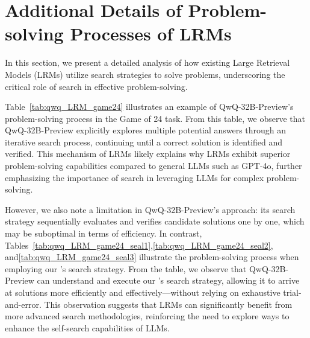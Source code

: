 \section{Additional Details of Problem-solving Processes of LRMs}
\label{appendix:more_details_of_problem_solving_processes_LRMs}
In this section, we present a detailed analysis of how existing Large Retrieval Models (LRMs) utilize search strategies to solve problems, underscoring the critical role of search in effective problem-solving. 

Table~\ref{tab:qwq_LRM_game24} illustrates an example of QwQ-32B-Preview's problem-solving process in the Game of 24 task. From this table, we observe that QwQ-32B-Preview explicitly explores multiple potential answers through an iterative search process, continuing until a correct solution is identified and verified. This mechanism of LRMs likely explains why LRMs exhibit superior problem-solving capabilities compared to general LLMs such as GPT-4o, further emphasizing the importance of search in leveraging LLMs for complex problem-solving.

However, we also note a limitation in QwQ-32B-Preview’s approach: its search strategy sequentially evaluates and verifies candidate solutions one by one, which may be suboptimal in terms of efficiency. In contrast, Tables~\ref{tab:qwq_LRM_game24_seal1},\ref{tab:qwq_LRM_game24_seal2}, and\ref{tab:qwq_LRM_game24_seal3} illustrate the problem-solving process when employing our \method's search strategy. From the table, we observe that QwQ-32B-Preview can understand and execute our \method's search strategy, allowing it to arrive at solutions more efficiently and effectively—without relying on exhaustive trial-and-error. This observation suggests that LRMs can significantly benefit from more advanced search methodologies, reinforcing the need to explore ways to enhance the self-search capabilities of LLMs.

